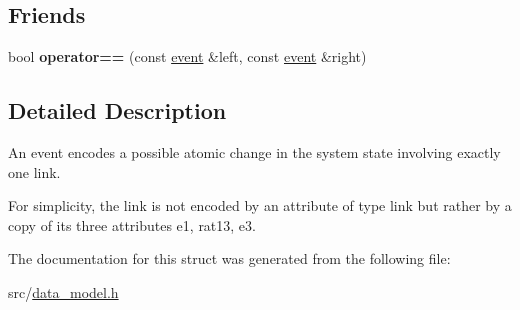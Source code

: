 \subsection*{Friends}
\begin{DoxyCompactItemize}
\item 
\mbox{\label{structtricl_1_1event_a3dd0c9c41d63a2d2171cffc7dfa14d6c}} 
bool {\bfseries operator==} (const \hyperlink{structtricl_1_1event}{event} \&left, const \hyperlink{structtricl_1_1event}{event} \&right)
\end{DoxyCompactItemize}


\subsection{Detailed Description}
An event encodes a possible atomic change in the system state involving exactly one link. 

For simplicity, the link is not encoded by an attribute of type link but rather by a copy of its three attributes e1, rat13, e3. 

The documentation for this struct was generated from the following file\+:\begin{DoxyCompactItemize}
\item 
src/\hyperlink{data__model_8h}{data\+\_\+model.\+h}\end{DoxyCompactItemize}
